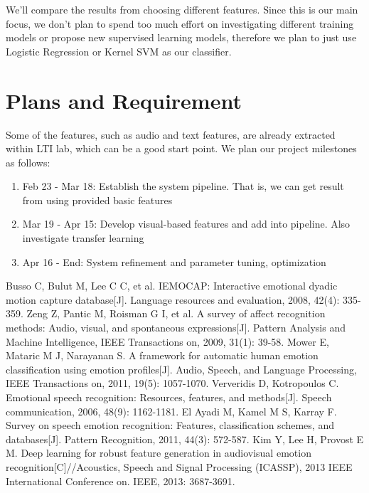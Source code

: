 \documentclass[a4page]{article}
\begin{document}
We'll compare the results from choosing different features. Since this is our main focus, we don't plan to spend too much effort on investigating different training models or propose new supervised learning models, therefore we plan to just use Logistic Regression or Kernel SVM as our classifier\cite{mower2011framework}. \\


\section{Plans and Requirement}

Some of the features, such as audio and text features, are already extracted within LTI lab, which can be a good start point. We plan our project milestones as follows:

\begin{enumerate}
\item Feb 23 - Mar 18: Establish the system pipeline. That is, we can get result from using provided basic features
\item Mar 19 - Apr 15: Develop visual-based features and add into pipeline. Also investigate transfer learning
\item Apr 16 - End: System refinement and parameter tuning, optimization
\end{enumerate}




\begin{thebibliography}{10}
Busso C, Bulut M, Lee C C, et al. IEMOCAP: Interactive emotional dyadic motion capture database[J]. Language resources and evaluation, 2008, 42(4): 335-359.
Zeng Z, Pantic M, Roisman G I, et al. A survey of affect recognition methods: Audio, visual, and spontaneous expressions[J]. Pattern Analysis and Machine Intelligence, IEEE Transactions on, 2009, 31(1): 39-58.
Mower E, Mataric M J, Narayanan S. A framework for automatic human emotion classification using emotion profiles[J]. Audio, Speech, and Language Processing, IEEE Transactions on, 2011, 19(5): 1057-1070.
Ververidis D, Kotropoulos C. Emotional speech recognition: Resources, features, and methods[J]. Speech communication, 2006, 48(9): 1162-1181.
El Ayadi M, Kamel M S, Karray F. Survey on speech emotion recognition: Features, classification schemes, and databases[J]. Pattern Recognition, 2011, 44(3): 572-587.
Kim Y, Lee H, Provost E M. Deep learning for robust feature generation in audiovisual emotion recognition[C]//Acoustics, Speech and Signal Processing (ICASSP), 2013 IEEE International Conference on. IEEE, 2013: 3687-3691.
\end{thebibliography}
\end{document}
